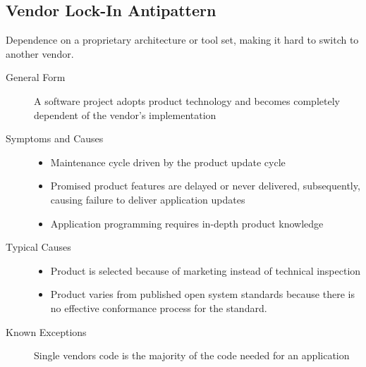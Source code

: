 \subsection{Vendor Lock-In Antipattern}
Dependence on a proprietary architecture or tool set, making it hard to switch to
another vendor.
\begin{description}
  \item[General Form] A software project adopts product technology and becomes completely dependent of the vendor's implementation
  \item[Symptoms and Causes] \hfill
  \begin{itemize}
    \item Maintenance cycle driven by the product update cycle
    \item Promised product features are delayed or never delivered, subsequently, causing failure to deliver application updates
    \item Application programming requires in-depth product knowledge
  \end{itemize}
  \item[Typical Causes] \hfill
  \begin{itemize}
    \item Product is selected because of marketing instead of technical inspection
    \item Product varies from published open system standards because there is no effective conformance process for the standard.
  \end{itemize}
  \item[Known Exceptions] Single vendors code is the majority of the code needed for an application
\end{description}
\newpage


